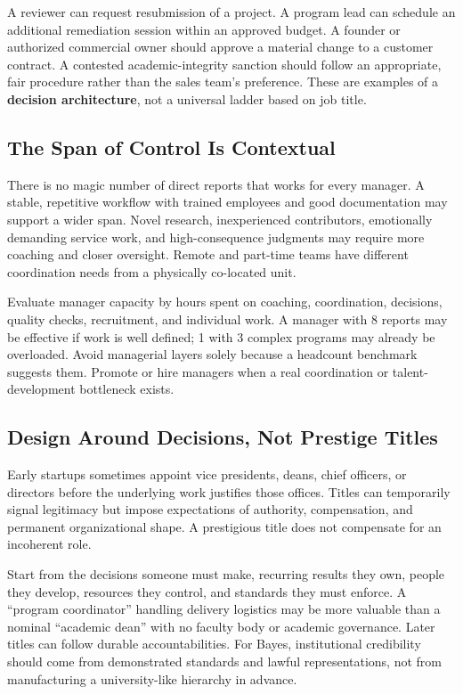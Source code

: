 A reviewer can request resubmission of a project. A program lead can schedule an additional remediation session within an approved budget. A founder or authorized commercial owner should approve a material change to a customer contract. A contested academic-integrity sanction should follow an appropriate, fair procedure rather than the sales team's preference. These are examples of a \textbf{decision architecture}, not a universal ladder based on job title.

\subsection{The Span of Control Is Contextual}
\label{sec:span_of_control_contextual}

There is no magic number of direct reports that works for every manager. A stable, repetitive workflow with trained employees and good documentation may support a wider span. Novel research, inexperienced contributors, emotionally demanding service work, and high-consequence judgments may require more coaching and closer oversight. Remote and part-time teams have different coordination needs from a physically co-located unit.

Evaluate manager capacity by hours spent on coaching, coordination, decisions, quality checks, recruitment, and individual work. A manager with 8 reports may be effective if work is well defined; 1 with 3 complex programs may already be overloaded. Avoid managerial layers solely because a headcount benchmark suggests them. Promote or hire managers when a real coordination or talent-development bottleneck exists.

\subsection{Design Around Decisions, Not Prestige Titles}
\label{sec:design_around_decisions_not_titles}

Early startups sometimes appoint vice presidents, deans, chief officers, or directors before the underlying work justifies those offices. Titles can temporarily signal legitimacy but impose expectations of authority, compensation, and permanent organizational shape. A prestigious title does not compensate for an incoherent role.

Start from the decisions someone must make, recurring results they own, people they develop, resources they control, and standards they must enforce. A ``program coordinator'' handling delivery logistics may be more valuable than a nominal ``academic dean'' with no faculty body or academic governance. Later titles can follow durable accountabilities. For Bayes, institutional credibility should come from demonstrated standards and lawful representations, not from manufacturing a university-like hierarchy in advance.

